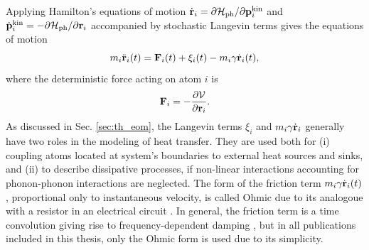 Applying Hamilton's equations of motion $\dot{\mathbf{r}}_i=\partial \mathcal{H}_{\textrm{ph}}/\partial \mathbf{p}_i^{\textrm{kin}}$ and $\dot{\mathbf{p}}_i^{\textrm{kin}}=-\partial \mathcal{H}_{\textrm{ph}}/\partial \mathbf{r}_i$ \cite{fetter} accompanied by stochastic Langevin terms \cite{dhar06} gives the equations of motion
\begin{equation}
 m_i \ddot{\mathbf{r}}_i(t) = \mathbf{F}_i(t) + \xi_i(t) - m_i \gamma \dot{\mathbf{r}}_i(t), \label{eq:th_eom}
\end{equation}
where the deterministic force acting on atom $i$ is
\begin{equation}
 \mathbf{F}_i = - \frac{\partial \mathcal{V}}{\partial \mathbf{r}_i}. \label{eq:th_force}
\end{equation}
As discussed in Sec. \ref{sec:th_eom}, the Langevin terms $\xi_i$ and $m_i\gamma \dot{\mathbf{r}}_i$ generally have two roles in the modeling of heat transfer. They are used both for (i) coupling atoms located at system's boundaries to external heat sources and sinks,  and (ii) to describe dissipative processes, if non-linear interactions accounting for phonon-phonon interactions are neglected. The form of the friction term $m_i \gamma \dot{\mathbf{r}}_i(t)$, proportional only to instantaneous velocity, is called Ohmic due to its analogoue with a resistor in an electrical circuit \cite{weiss}. In general, the friction term is a time convolution giving rise to frequency-dependent damping \cite{weiss}, but in all publications included in this thesis, only the Ohmic form is used due to its simplicity.

